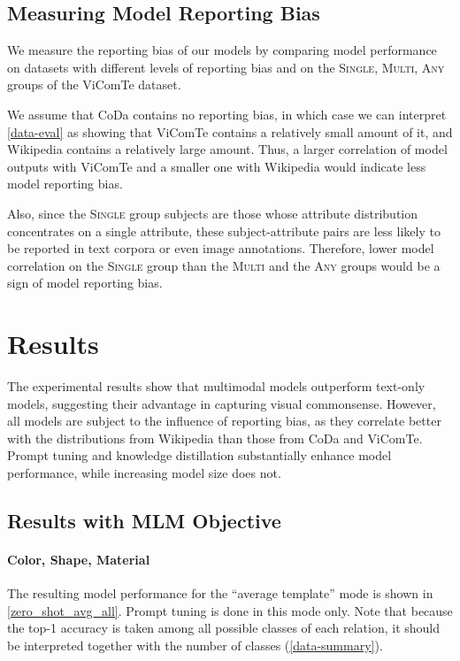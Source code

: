 \documentclass[11pt]{article}
\newcommand{\Single}{{\scshape Single}}
\newcommand{\Multi}{{\scshape Multi}}
\newcommand{\Any}{{\scshape Any}}
\newcommand{\dataset}{ViComTe}
\begin{document}
\subsection{Measuring Model Reporting Bias}

We measure the reporting bias of our models by comparing model performance on datasets with different levels of reporting bias and on the \Single{}, \Multi{}, \Any{} groups of the {\dataset} dataset.

We assume that CoDa contains no reporting bias, in which case we can interpret \cref{data-eval} as showing that {\dataset} contains a relatively small amount of it, and Wikipedia contains a relatively large amount. Thus, a larger correlation of model outputs with {\dataset} and a smaller one with Wikipedia would indicate less model reporting bias.

Also, since the \Single{} group subjects are those whose attribute distribution concentrates on a single attribute, these subject-attribute pairs are less likely to be reported in text corpora or even image annotations. Therefore, lower model correlation on the \Single{} group than the \Multi{} and the \Any{} groups would be a sign of model reporting bias.

\section{Results}



The experimental results show that multimodal models outperform text-only models, suggesting their advantage in capturing visual commonsense. However, all models are subject to the influence of reporting bias, as they correlate better with the distributions from Wikipedia than those from CoDa and {\dataset}. Prompt tuning and knowledge distillation substantially enhance model performance, while increasing model size does not.

\subsection{Results with MLM Objective}

\paragraph{Color, Shape, Material}

The resulting model performance for the ``average template'' mode is shown in  \cref{zero_shot_avg_all}. Prompt tuning is done in this mode only. Note that because the top-1 accuracy is taken among all possible classes of each relation, it should be interpreted together with the number of classes (\cref{data-summary}).
\end{document}
